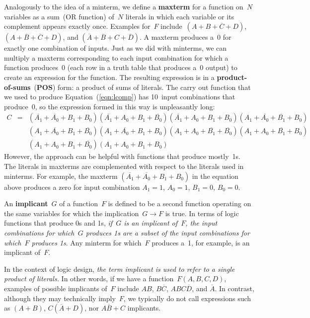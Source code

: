 Analogously to the idea of a minterm, 
we define a {\bf maxterm} for a function on~$N$ variables as a sum~(OR 
function) of~$N$ literals in which each variable or its complement 
appears exactly once.  Examples for~$F$ include~$(A+B+\overline{C}+D)$,
$(A+\overline{B}+\overline{C}+D)$, and
$(\overline{A}+\overline{B}+C+\overline{D})$.
A maxterm produces a~0 for exactly
one combination of inputs.  Just as we did with minterms, we can
multiply a maxterm corresponding to each input combination for which
a function produces~0 (each row in a truth table that produces a~0
output) to create
an expression for the function.  The resulting expression is in
a {\bf product-of-sums}~({\bf POS}) form: a product of sums of literals.  
%
The carry out function that we used to produce 
Equation~(\ref{eqn:lcomp}) has 10~input combinations that produce~0,
so the expression formed in this way is unpleasantly long:
%
\begin{eqnarray*}
C&=&
(\overline{A_1}+\overline{A_0}+B_1+B_0)
(\overline{A_1}+A_0+B_1+\overline{B_0})
(\overline{A_1}+A_0+B_1+B_0)
(A_1+\overline{A_0}+\overline{B_1}+B_0)\\
&&(A_1+\overline{A_0}+B_1+\overline{B_0})
(A_1+\overline{A_0}+B_1+B_0)
(A_1+A_0+\overline{B_1}+\overline{B_0})
(A_1+A_0+\overline{B_1}+B_0)\\
&&(A_1+A_0+B_1+\overline{B_0})
(A_1+A_0+B_1+B_0)
\end{eqnarray*}
%
However, the approach can be helpful with functions that produce mostly~1s.
The literals in maxterms are complemented with respect to the
literals used in minterms.  For example, the maxterm
$(\overline{A_1}+\overline{A_0}+B_1+B_0)$ in the equation above
produces a zero for input combination $A_1=1$, $A_0=1$, $B_1=0$, $B_0=0$.

An {\bf implicant}~$G$ of a function~$F$ is defined to be a second
function operating on the same variables for which
the implication~$G\rightarrow{F}$ is true.  In terms of logic functions
that produce 0s and 1s, {\em if~$G$ is an implicant of~$F$, 
the input combinations for which~$G$ produces 1s are a subset of 
the input combinations for which~$F$ produces 1s}.
%
Any minterm for which~$F$ produces a~1, for example, is an implicant of~$F$.

In the context of logic design, {\em the term implicant is used
to refer to a single product of literals.}  In other words, if we
have a function~$F(A,B,C,D)$, examples of possible implicants of~$F$
include $AB$, $B\overline{C}$, $ABC\overline{D}$, and $\overline{A}$.
In contrast, although they may technically imply~$F$, we typically
do not call expressions such as $(A+B)$, $C(\overline{A}+D)$, nor
$A\overline{B}+C$ implicants.

